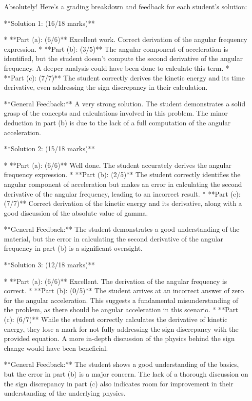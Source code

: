 \documentclass[a4paper,11pt]{article}
\begin{document}
Absolutely! Here's a grading breakdown and feedback for each student's solution:

**Solution 1: (16/18 marks)**

* **Part (a): (6/6)** Excellent work. Correct derivation of the angular frequency expression.
* **Part (b): (3/5)** The angular component of acceleration is identified, but the student doesn't compute the second derivative of the angular frequency. A deeper analysis could have been done to calculate this term.
* **Part (c): (7/7)**  The student correctly derives the kinetic energy and its time derivative, even addressing the sign discrepancy in their calculation.

**General Feedback:** A very strong solution. The student demonstrates a solid grasp of the concepts and calculations involved in this problem. The minor deduction in part (b) is due to the lack of a full computation of the angular acceleration.

**Solution 2: (15/18 marks)**

* **Part (a): (6/6)** Well done. The student accurately derives the angular frequency expression.
* **Part (b): (2/5)** The student correctly identifies the angular component of acceleration but makes an error in calculating the second derivative of the angular frequency, leading to an incorrect result.
* **Part (c): (7/7)** Correct derivation of the kinetic energy and its derivative, along with a good discussion of the absolute value of gamma.

**General Feedback:** The student demonstrates a good understanding of the material, but the error in calculating the second derivative of the angular frequency in part (b) is a significant oversight. 

**Solution 3: (12/18 marks)**

* **Part (a): (6/6)**  Excellent. The derivation of the angular frequency is correct.
* **Part (b): (0/5)** The student arrives at an incorrect answer of zero for the angular acceleration. This suggests a fundamental misunderstanding of the problem, as there should be angular acceleration in this scenario.
* **Part (c): (6/7)** While the student correctly calculates the derivative of kinetic energy, they lose a mark for not fully addressing the sign discrepancy with the provided equation. A more in-depth discussion of the physics behind the sign change would have been beneficial.

**General Feedback:**  The student shows a good understanding of the basics, but the error in part (b) is a major concern. The lack of a thorough discussion on the sign discrepancy in part (c) also indicates room for improvement in their understanding of the underlying physics.
\end{document}
